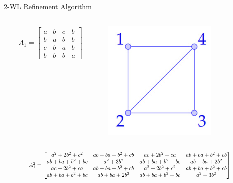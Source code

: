 \documentclass{beamer}
\begin{document}
\begin{frame}{2-WL Refinement Algorithm}
    \begin{columns}
        \begin{column}{0.7\textwidth}
        \begin{align*}
            A_1 = \begin{bmatrix}
                a&b&c&b\\
                b&a&b&b\\
                c&b&a&b\\
                b&b&b&a
            \end{bmatrix}
        \end{align*}
        \end{column}

        \begin{column}{0.3\textwidth}
            \centering
            \includegraphics[width=0.7\textwidth]{slides/pic_1.jpg}
        \end{column}
    \end{columns}
    
    \vspace{1em}
    \[
    \scalebox{0.8}{
    $
        A_1^2 = \begin{bmatrix}
            a^2+2b^2+c^2 & ab+ba+b^2+cb&ac+2b^2+ca & ab+ba+b^2+cb\\
            ab+ba+b^2+bc&a^2+3b^2 & ab+ba+b^2+bc & ab+ba+2b^2\\
            ac+2b^2+ca&ab+ba+b^2+cb&a^2+2b^2+c^2&ab+ba+b^2+cb\\
            ab+ba+b^2+bc&ab+ba+2b^2&ab+ba+b^2+bc&a^2+3b^2
        \end{bmatrix}
    $
    }
    \]
    
\end{frame}
\addtocounter{framenumber}{-1}
\end{document}
